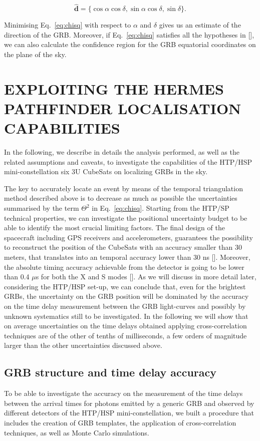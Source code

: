 \documentclass[]{spie}  %
\renewcommand\vec{\bm}
\begin{document}
  \begin{equation}
    \hat{\vec{d}} = \{\cos{\alpha} \cos{\delta}, \sin{\alpha} \cos{\delta}, \sin{\delta}\}.
  \end{equation}

Minimising Eq.~\ref{eq:chisq} with respect to $\alpha$ and $\delta$ gives us an estimate of the direction of the GRB.
Moreover, if Eq.~\ref{eq:chisq} satisfies all the hypotheses in [], we can also calculate the confidence region for the GRB equatorial coordinates on the plane of the sky.



\section{EXPLOITING THE HERMES PATHFINDER LOCALISATION CAPABILITIES }

In the following, we describe in details the analysis performed, as well as the related assumptions and caveats, to investigate the capabilities of the HTP/HSP mini-constellation six 3U CubeSats on localizing GRBs in the sky.

The key to accurately locate an event by means of the temporal triangulation method described above is to decrease as much as possible the uncertainties summarised by the term $\Theta^2$ in Eq.~\ref{eq:chisq}. Starting from the HTP/SP technical properties, we can investigate the positional uncertainty budget to be able to identify the most crucial limiting factors. The final design of the spacecraft including GPS receivers and accelerometers, guarantees the possibility to reconstruct the position of the CubeSats with an accuracy smaller than 30 meters, that translates into an temporal accuracy lower than 30 ns []. Moreover, the absolute timing accuracy achievable from the detector is going to be lower than 0.4 $\mu$s for both the X and S modes []. As we will discuss in more detail later, considering the HTP/HSP set-up, we can conclude that, even for the brightest GRBs, the uncertainty on the GRB position will be dominated by the accuracy on the time delay measurement between the GRB light-curves and possibly by unknown systematics still to be investigated. In the following we will show that on average uncertainties on the time delays obtained applying cross-correlation techniques are of the other of tenths of milliseconds, a few orders of magnitude larger than the other uncertainties discussed above.

\subsection{GRB structure and time delay accuracy}
\label{sec:grbcc}
To be able to investigate the accuracy on the measurement of the time delays between the arrival times for photons emitted by a generic GRB and observed by different detectors of the HTP/HSP mini-constellation, we built a procedure that includes the creation of GRB templates, the application of cross-correlation techniques, as well as Monte Carlo simulations.
\end{document}
